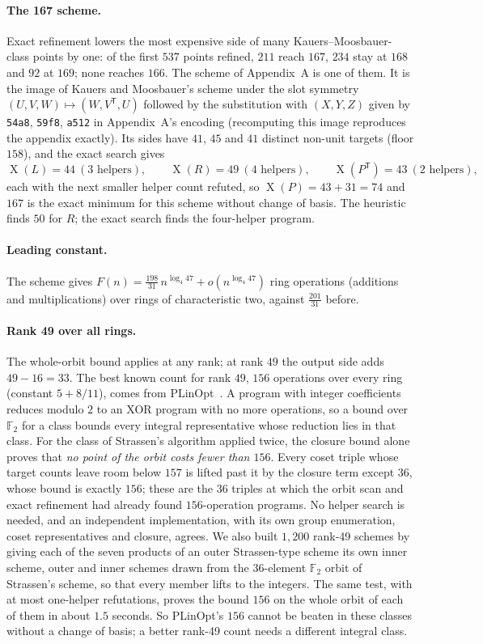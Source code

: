 \documentclass[11pt]{article}
\theoremstyle{remark}
\newcommand{\F}{\mathbb{F}}
\newcommand{\XOR}{\operatorname{X}}
\begin{document}
\paragraph{The 167 scheme.}  Exact refinement lowers the most expensive
side of many Kauers--Moosbauer-class points by one: of the first $537$
points refined, $211$ reach $167$, $234$ stay at $168$ and $92$ at $169$;
none reaches $166$.  The scheme of Appendix~A is one of them.  It is the
image of Kauers and Moosbauer's scheme under the slot symmetry
$(U,V,W)\mapsto(W,V^{\mathsf T},U)$ followed by the substitution with
$(X,Y,Z)$ given by \texttt{54a8}, \texttt{59f8}, \texttt{a512} in
Appendix~A's encoding (recomputing this image reproduces the appendix
exactly).  Its sides have $41$, $45$ and
$41$ distinct non-unit targets (floor $158$), and the exact search
gives
\[
\XOR(L)=44\ (3\text{ helpers}),\qquad
\XOR(R)=49\ (4\text{ helpers}),\qquad
\XOR(P^{\mathsf T})=43\ (2\text{ helpers}),
\]
each with the next smaller helper count refuted, so
$\XOR(P)=43+31=74$ and $167$ is the exact minimum for this scheme
without change of basis.  The heuristic finds $50$ for $R$; the exact
search finds the four-helper program.

\paragraph{Leading constant.}  The scheme gives
$F(n)=\tfrac{198}{31}\,n^{\log_4 47}+o(n^{\log_4 47})$ ring
operations (additions and multiplications) over rings of characteristic
two, against $\tfrac{201}{31}$ before.

\paragraph{Rank 49 over all rings.}  The whole-orbit bound applies at
any rank; at rank $49$ the output side adds $49-16=33$.  The best known
count for rank $49$, $156$ operations over every ring (constant
$5+8/11$), comes from PLinOpt~\cite{PLinOpt}.  A program with integer
coefficients reduces modulo $2$ to an XOR program with no more
operations, so a bound over $\F_2$ for a class bounds every integral
representative whose reduction lies in that class.  For the class of
Strassen's algorithm applied twice, the closure bound alone proves that
\emph{no point of the orbit costs fewer than $156$}.  Every coset
triple whose target counts leave room below $157$ is lifted past it by
the closure term except $36$, whose bound is exactly $156$; these are
the $36$ triples at which the orbit scan and exact refinement had
already found $156$-operation programs.  No helper search is needed,
and an independent implementation, with its own group enumeration,
coset representatives and closure, agrees.  We also built $1{,}200$
rank-49 schemes by giving each of the seven products of an outer
Strassen-type scheme its own inner scheme, outer and inner schemes
drawn from the $36$-element $\F_2$ orbit of Strassen's scheme, so that
every member lifts to the integers.  The same test, with at most
one-helper refutations, proves the bound $156$ on the whole orbit of
each of them in about $1.5$ seconds.  So PLinOpt's $156$ cannot be
beaten in these classes without a change of basis; a better rank-49
count needs a different integral class.
\end{document}
